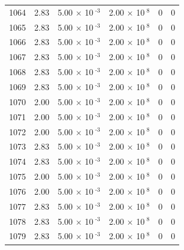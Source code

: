\documentclass[a4paper,11pt]{article}
\begin{document}
\begin{center}
\begin{longtable}{|R{1.5cm}|R{2.4cm}|R{2.4cm}|R{2.4cm}|R{2.4cm}|R{2.4cm}|}
 1064 &   2.83  &         5.00 $\times$ 10$^{\text{          -3}}$  &         2.00 $\times$ 10$^{\text{           8}}$  & 0  & 0 \\
 1065 &   2.83  &         5.00 $\times$ 10$^{\text{          -3}}$  &         2.00 $\times$ 10$^{\text{           8}}$  & 0  & 0 \\
 1066 &   2.83  &         5.00 $\times$ 10$^{\text{          -3}}$  &         2.00 $\times$ 10$^{\text{           8}}$  & 0  & 0 \\
 1067 &   2.83  &         5.00 $\times$ 10$^{\text{          -3}}$  &         2.00 $\times$ 10$^{\text{           8}}$  & 0  & 0 \\
 1068 &   2.83  &         5.00 $\times$ 10$^{\text{          -3}}$  &         2.00 $\times$ 10$^{\text{           8}}$  & 0  & 0 \\
 1069 &   2.83  &         5.00 $\times$ 10$^{\text{          -3}}$  &         2.00 $\times$ 10$^{\text{           8}}$  & 0  & 0 \\
 1070 &   2.00  &         5.00 $\times$ 10$^{\text{          -3}}$  &         2.00 $\times$ 10$^{\text{           8}}$  & 0  & 0 \\
 1071 &   2.00  &         5.00 $\times$ 10$^{\text{          -3}}$  &         2.00 $\times$ 10$^{\text{           8}}$  & 0  & 0 \\
 1072 &   2.00  &         5.00 $\times$ 10$^{\text{          -3}}$  &         2.00 $\times$ 10$^{\text{           8}}$  & 0  & 0 \\
 1073 &   2.83  &         5.00 $\times$ 10$^{\text{          -3}}$  &         2.00 $\times$ 10$^{\text{           8}}$  & 0  & 0 \\
 1074 &   2.83  &         5.00 $\times$ 10$^{\text{          -3}}$  &         2.00 $\times$ 10$^{\text{           8}}$  & 0  & 0 \\
 1075 &   2.00  &         5.00 $\times$ 10$^{\text{          -3}}$  &         2.00 $\times$ 10$^{\text{           8}}$  & 0  & 0 \\
 1076 &   2.00  &         5.00 $\times$ 10$^{\text{          -3}}$  &         2.00 $\times$ 10$^{\text{           8}}$  & 0  & 0 \\
 1077 &   2.83  &         5.00 $\times$ 10$^{\text{          -3}}$  &         2.00 $\times$ 10$^{\text{           8}}$  & 0  & 0 \\
 1078 &   2.83  &         5.00 $\times$ 10$^{\text{          -3}}$  &         2.00 $\times$ 10$^{\text{           8}}$  & 0  & 0 \\
 1079 &   2.83  &         5.00 $\times$ 10$^{\text{          -3}}$  &         2.00 $\times$ 10$^{\text{           8}}$  & 0  & 0 \\

\end{longtable}
\end{center}
\end{document}

